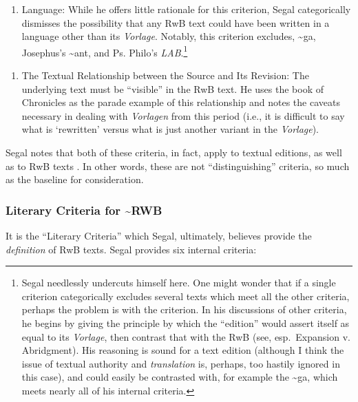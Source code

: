 \begin{enumerate}
\def\labelenumi{\arabic{enumi}.}
\tightlist
\item
  Language: While he offers little rationale for this criterion, Segal
  categorically dismisses the possibility that any RwB text could have
  been written in a language other than its \emph{Vorlage}. Notably,
  this criterion excludes, \textasciitilde{}ga, Josephus's
  \textasciitilde{}ant, and Ps. Philo's \emph{LAB}.\footnote{Segal
    needlessly undercuts himself here. One might wonder that if a single
    criterion categorically excludes several texts which meet all the
    other criteria, perhaps the problem is with the criterion. In his
    discussions of other criteria, he begins by giving the principle by
    which the ``edition'' would assert itself as equal to its
    \emph{Vorlage}, then contrast that with the RwB (see, esp.~Expansion
    v. Abridgment). His reasoning is sound for a text edition (although
    I think the issue of textual authority and \emph{translation} is,
    perhaps, too hastily ignored in this case), and could easily be
    contrasted with, for example the \textasciitilde{}ga, which meets
    nearly all of his internal criteria.}
\end{enumerate}

\begin{enumerate}
\def\labelenumi{\arabic{enumi}.}
\setcounter{enumi}{1}
\tightlist
\item
  The Textual Relationship between the Source and Its Revision: The
  underlying text must be ``visible'' in the RwB text. He uses the book
  of Chronicles as the parade example of this relationship and notes the
  caveats necessary in dealing with \emph{Vorlagen} from this period
  (i.e., it is difficult to say what is `rewritten' versus what is just
  another variant in the \emph{Vorlage}).
\end{enumerate}

Segal notes that both of these criteria, in fact, apply to textual
editions, as well as to RwB texts \autocite[20]{segal_henze2005}. In
other words, these are not ``distinguishing'' criteria, so much as the
baseline for consideration.

\hypertarget{literary-criteria-for-rwb}{%
\subsubsection{Literary Criteria for
\textasciitilde{}RWB}\label{literary-criteria-for-rwb}}

It is the ``Literary Criteria'' which Segal, ultimately, believes
provide the \emph{definition} of RwB
texts.\autocite[20]{segal_henze2005} Segal provides six internal
criteria:

